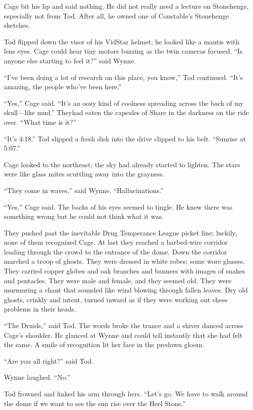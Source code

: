 Cage bit his lip and said nothing. He did not really need a lecture on Stonehenge, especially not from Tod. After all, he owned one of Constable's Stonehenge sketches.

Tod flipped down the visor of his VidStar helmet; he looked like a mantis with lens eyes. Cage could hear tiny motors buzzing as the twin cameras focused. ``Is anyone else starting to feel it?'' said Wynne.

``I've been doing a lot of research on this place, you know,'' Tod continued. ``It's amazing, the people who've been here.''

``Yes,'' Cage said. ``It's an oozy kind of coolness spreading across the back of my skull---like mud.'' Theyhad eaten the capsules of Share in the darkness on the ride over. ``What time is it?''

``It's 4:18.'' Tod slipped a fresh disk into the drive clipped to his belt. ``Sunrise at 5:07.''

Cage looked to the northeast; the sky had already started to lighten. The stars were like glass mites scuttling away into the grayness.

``They come in waves,'' said Wynne. ``Hallucinations.''

``Yes,'' Cage said. The backs of his eyes seemed to tingle. He knew there was something wrong but he could not think what it was.

They pushed past the inevitable Drug Temperance League picket line; luckily, none of them recognized Cage. At last they reached a barbed-wire corridor leading through the crowd to the entrance of the dome. Down the corridor marched a troop of ghosts. They were dressed in white robes; some wore glasses. They carried copper globes and oak branches and banners with images of snakes and pentacles. They were male and female, and they seemed old. They were murmuring a chant that sounded like wind blowing through fallen leaves. Dry old ghosts, crinkly and intent, turned inward as if they were working out chess problems in their heads.

``The Druids,'' said Tod. The words broke the trance and a shiver danced across Cage's shoulder. He glanced at Wynne and could tell instantly that she had felt the same. A smile of recognition lit her face in the predawn gloom.

``Are you all right?'' said Tod.

Wynne laughed. ``No.''

Tod frowned and linked his arm through hers. ``Let's go. We have to walk around the dome if we want to see the sun rise over the Heel Stone.''

